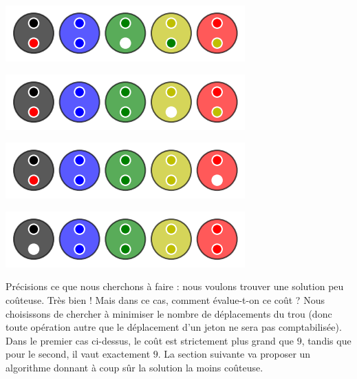 \begin{multicols}{2}
\begin{center}
		\includegraphics[scale= 0.45]{content/optimal/where_do_we_go/tree_sol/006.png}

		\includegraphics[scale= 0.45]{content/optimal/where_do_we_go/tree_sol/007.png}

		\includegraphics[scale= 0.45]{content/optimal/where_do_we_go/tree_sol/008.png}

		\includegraphics[scale= 0.45]{content/optimal/where_do_we_go/tree_sol/009.png}
	\end{center}
\end{multicols}


\medskip

Précisions ce que nous cherchons à faire : nous voulons trouver une solution peu coûteuse. Très bien ! Mais dans ce cas, comment évalue-t-on ce coût ? Nous choisissons de chercher à minimiser le nombre de déplacements du trou (donc toute opération autre que le déplacement d'un jeton ne sera pas comptabilisée).
Dans le premier cas ci-dessus, le coût est strictement plus grand que $9$, tandis que pour le second, il vaut exactement $9$. La section suivante va proposer un algorithme donnant à coup sûr la solution la moins coûteuse.

